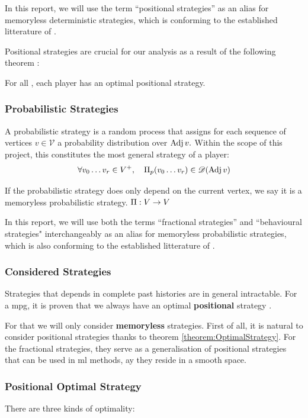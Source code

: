 In this report, we will use the term ``positional strategies'' as an alias for memoryless deterministic strategies, which is conforming to the established litterature of .

Positional strategies are crucial for our analysis as a result of the following theorem \cite{PositionalStrategies}:
\begin{theorem}
	\label{theorem:OptimalStrategy}
	For all , each player has an optimal positional strategy.
\end{theorem}

\subsubsection{Probabilistic Strategies}
A probabilistic strategy is a random process that assigns for each sequence of vertices $v\in\mathcal{V}$ a probability distribution over $\operatorname{Adj} v.$ Within the scope of this project, this constitutes the most general strategy of a player:
$$
\forall v_0\dots v_r\in V^+, \quad \Pi_p(v_0\dots v_r) \in \mathscr{D}(\operatorname{Adj} v)
$$

If the probabilistic strategy does only depend on the current vertex, we say it is a memoryless probabilistic strategy.  $\Pi:V\rightarrow V$

In this report, we will use both the terms ``fractional strategies'' and ``behavioural strategies" interchangeably as an alias for memoryless probabilistic strategies, which is also conforming to the established litterature of .
\subsubsection{Considered Strategies}
Strategies that depends in complete past histories are in general intractable. For a \acrshort{mpg}, it is proven that we always have an optimal \textbf{positional} strategy \cite{PositionalStrategies}.

For that we will only consider \textbf{memoryless} strategies. First of all, it is natural to consider positional strategies thanks to theorem \ref{theorem:OptimalStrategy}. For the fractional strategies, they serve as a generalisation of positional strategies that can be used in \acrfull{ml} methods, ay they reside in a smooth space.
\subsubsection{Positional Optimal Strategy}
There are three kinds of optimality:
